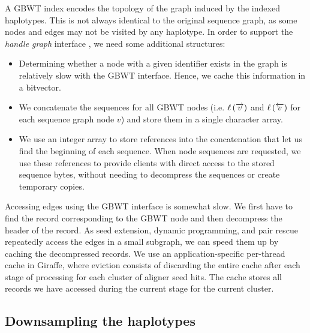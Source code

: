 \documentclass[11pt]{ucscthesis}
\newcommand{\nodelabel}[1]{\ensuremath{\ell\left( #1 \right)}}
\newcommand{\forwardnode}[1]{\ensuremath{\protect\overrightarrow{ #1 }}}
\newcommand{\reversenode}[1]{\ensuremath{\protect\overleftarrow{ #1 }}}
\newcommand{\vocab}[1]{\emph{#1}}
\begin{document}
A GBWT index encodes the topology of the graph induced by the indexed haplotypes.
This is not always identical to the original sequence graph, as some nodes and edges may not be visited by any haplotype.
In order to support the \vocab{handle graph} interface \cite{eizenga2020efficient}, we need some additional structures:
\begin{itemize}

\item Determining whether a node with a given identifier exists in the graph is relatively slow with the GBWT interface.
Hence, we cache this information in a bitvector.

\item We concatenate the sequences for all GBWT nodes (i.e. $\nodelabel{\forwardnode{v}}$ and $\nodelabel{\reversenode{v}}$ for each sequence graph node $v$) and store them in a single character array.

\item We use an integer array to store references into the concatenation that let us find the beginning of each sequence. When node sequences are requested, we use these references to provide clients with direct access to the stored sequence bytes, without needing to decompress the sequences or create temporary copies.

\end{itemize}

Accessing edges using the GBWT interface is somewhat slow.
We first have to find the record corresponding to the GBWT node and then decompress the header of the record.
As seed extension, dynamic programming, and pair rescue repeatedly access the edges in a small subgraph, we can speed them up by caching the decompressed records.
We use an application-specific per-thread cache in Giraffe, where eviction consists of discarding the entire cache after each stage of processing for each cluster of aligner seed hits. The cache stores all records we have accessed during the current stage for the current cluster.


\subsection{Downsampling the haplotypes}
\label{subsec:aim2:downsampling}
\end{document}
